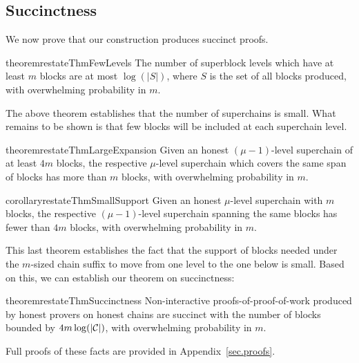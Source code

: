 \subsection{Succinctness}

We now prove that our construction produces succinct proofs.

\begin{restatable}{theorem}{restateThmFewLevels}
    \label{thm.few-levels}
    The number of superblock levels which have at least $m$ blocks are at most
    $\log(|S|)$, where $S$ is the set of all blocks produced, with overwhelming
    probability in $m$.
\end{restatable}

The above theorem establishes that the number of superchains is small. What
remains to be shown is that few blocks will be included at each superchain
level.

\begin{restatable}{theorem}{restateThmLargeExpansion}
    \label{thm.large-expansion}
    Given an honest $(\mu - 1)$-level superchain of at least $4m$ blocks,
    the respective $\mu$-level
    superchain which covers the same span of blocks has more than $m$ blocks,
    with overwhelming probability in $m$.
\end{restatable}

\begin{restatable}{corollary}{restateThmSmallSupport}
    \label{crly.small-support}
    Given an honest $\mu$-level superchain with $m$ blocks, the respective
    $(\mu - 1)$-level superchain spanning the same blocks has fewer than $4m$
    blocks, with overwhelming probability in $m$.
\end{restatable}

This last theorem establishes the fact that the support of blocks needed under
the $m$-sized chain suffix to move from one level to the one below is small.
Based on this, we can establish our theorem on succinctness:

\begin{restatable}{theorem}{restateThmSuccinctness}
    \label{thm.succinctness}
    Non-interactive proofs-of-proof-of-work produced by honest provers on
    honest chains are succinct with the number of blocks bounded by $4m
    \log(|\mathcal{C}|)$, with overwhelming probability in $m$.
\end{restatable}

Full proofs of these facts are provided in Appendix~\ref{sec.proofs}.

